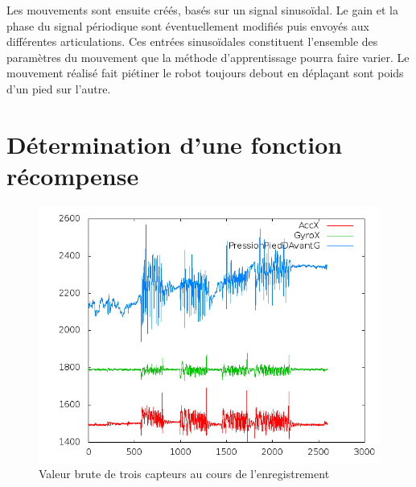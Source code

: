 \documentclass[11pt]{article}
\begin{document}
Les mouvements sont ensuite créés, basés sur un signal sinusoïdal. Le gain et la phase du signal périodique 
sont éventuellement modifiés puis envoyés aux différentes articulations. Ces entrées sinusoïdales constituent l'ensemble des paramètres du mouvement que la méthode d'apprentissage pourra faire varier. Le mouvement réalisé fait piétiner le robot 
toujours debout en déplaçant sont poids d'un pied sur l'autre.

\section{Détermination d'une fonction récompense}

\begin{figure}[h]
    \includegraphics[scale=0.6]{sensors.png}
    \caption{Valeur brute de trois capteurs au cours de l'enregistrement}
\end{figure}
\end{document}
